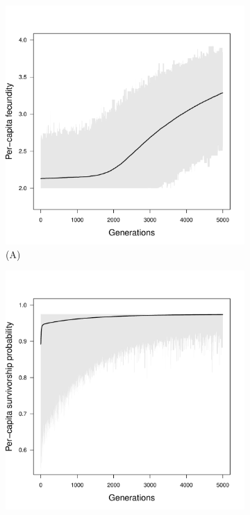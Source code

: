 \documentclass[11pt]{article}
\begin{document}
\begin{figure}[h!]
   \centering
   \begin{subfigure}[b]{0.49\textwidth}
    \centering
   \includegraphics[width=\linewidth] {SupplementaryFigures/FigS1A.pdf}\quad
	\caption*{(A)}        
	\end{subfigure}
   \begin{subfigure}[b]{0.49\textwidth}
    \centering
   \includegraphics[width=\linewidth] {SupplementaryFigures/FigS1B.pdf}

\end{subfigure}
\end{figure}
\end{document}
